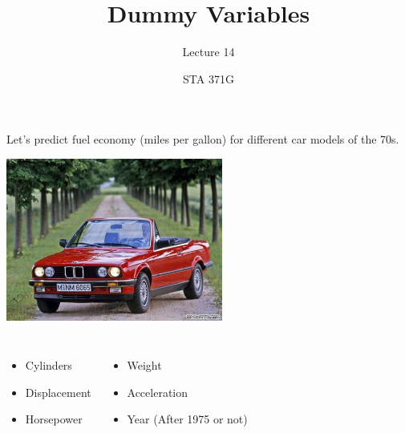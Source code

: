 \documentclass{beamer}\usepackage[]{graphicx}\usepackage[]{color}
\title{Dummy Variables}
\subtitle{Lecture 14}
\author{STA 371G}
\begin{document}
  
  
  

  \frame{\maketitle}



  \begin{darkframes}
    \begin{frame}
      \fontsize{9}{9}\selectfont
      Let's predict fuel economy (miles per gallon) for different car models of the 70s.

      \begin{center}
        \includegraphics[width=2.8in]{bmw} \\
      \end{center} \pause

      \begin{columns}[onlytextwidth]
          \begin{itemize}
            \item Cylinders
            \item Displacement
            \item Horsepower
          \end{itemize}
          \begin{itemize}
            \item Weight
            \item Acceleration
            \item Year (After 1975 or not)
          \end{itemize}
      \end{columns}
    \end{frame}



\end{darkframes}
\end{document}
